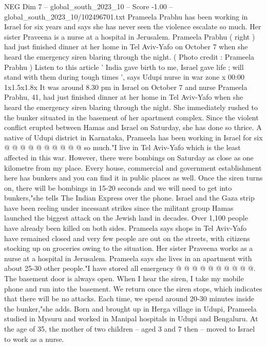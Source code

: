 \begin{textsample}{NEG Dim 7 – global\_south\_2023\_10 – Score -1.00 – global\_south\_2023\_10/102496701.txt}  \label{ex:f7_neg_064}
Prameela Prabhu has been working in Israel for six years and says she has never seen the violence escalate so much.
Her sister Praveena is a nurse at a hospital in Jerusalem.
Prameela Prabhu ( right ) had just finished dinner at her home in Tel Aviv-Yafo on October 7 when she heard the emergency siren blaring through the night. ( Photo credit : Prameela Prabhu ) Listen to this article ' India gave birth to me, Israel gave life ; will stand with them during tough times ', says Udupi nurse in war zone x 00:00 1x1.5x1.8x It was around 8.30 pm in Israel on October 7 and nurse Prameela Prabhu, 41, had just finished dinner at her home in Tel Aviv-Yafo when she heard the emergency siren blaring through the night.
She immediately rushed to the bunker situated in the basement of her apartment complex.
Since the violent conflict erupted between Hamas and Israel on Saturday, she has done so thrice.
A native of Udupi district in Karnataka, Prameela has been working in Israel for six @ @ @ @ @ @ @ @ @ @ so much."I live in Tel Aviv-Yafo which is the least affected in this war.
However, there were bombings on Saturday as close as one kilometre from my place.
Every house, commercial and government establishment here has bunkers and you can find it in public places as well.
Once the siren turns on, there will be bombings in 15-20 seconds and we will need to get into bunkers,"she tells The Indian Express over the phone.
Israel and the Gaza strip have been reeling under incessant strikes since the militant group Hamas launched the biggest attack on the Jewish land in decades.
Over 1,100 people have already been killed on both sides.
Prameela says shops in Tel Aviv-Yafo have remained closed and very few people are out on the streets, with citizens stocking up on groceries owing to the situation.
Her sister Praveena works as a nurse at a hospital in Jerusalem.
Prameela says she lives in an apartment with about 25-30 other people."I have stored all emergency @ @ @ @ @ @ @ @ @ @.
The basement door is always open.
When I hear the siren, I take my mobile phone and run into the basement.
We return once the siren stops, which indicates that there will be no attacks.
Each time, we spend around 20-30 minutes inside the bunker,"she adds.
Born and brought up in Herga village in Udupi, Prameela studied in Mysuru and worked in Manipal hospitals in Udupi and Bengaluru.
At the age of 35, the mother of two children -- aged 3 and 7 then -- moved to Israel to work as a nurse.

\end{textsample}
